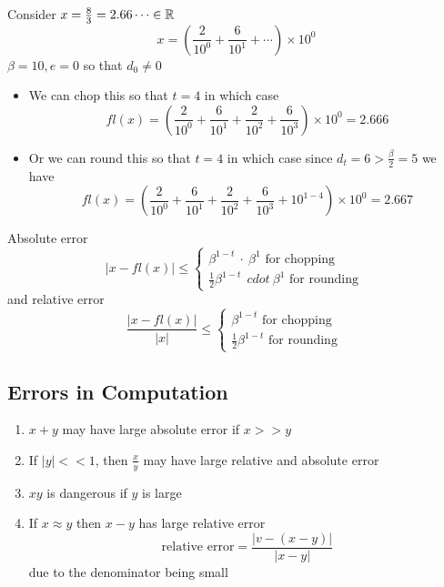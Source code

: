\documentclass[12pt]{scrartcl}
\begin{document}
\begin{example}
  Consider $x = \frac{8}{3} = 2.66\cdots \in \mathbb R$
  \[x = (\frac{2}{10^0} + \frac{6}{10^1} + \cdots) \times 10^0\]
  $\beta = 10, e = 0$ so that $d_0 \neq 0$

  \begin{itemize}
    \item We can chop this so that $t = 4$ in which case 
    \[fl(x) = (\frac{2}{10^0} + \frac{6}{10^1} + \frac{2}{10^2} + \frac{6}{10^3}) \times 10^0 = 2.666\]
    \item Or we can round this so that $t = 4$ in which case since $d_t = 6 > \frac{\beta}{2} = 5$ we have 
    \[fl(x) = (\frac{2}{10^0} + \frac{6}{10^1} + \frac{2}{10^2} + \frac{6}{10^3} + 10^{1-4}) \times 10^0 = 2.667\]
  \end{itemize}
\end{example}

\begin{theorem}
  Absolute error 
  \[|x - fl(x)| \leq \begin{cases}
    \beta^{1-t} \ \cdot \ \beta^1 \text{ for chopping } \\
    \frac{1}{2}\beta^{1-t} \ \ cdot \ \beta^1 \text{ for rounding }
  \end{cases}\]
  and relative error 
  \[\frac{|x - fl(x)|}{|x|} \leq \begin{cases}
    \beta^{1-t} \text{ for chopping } \\
    \frac{1}{2}\beta^{1-t} \text{ for rounding }
  \end{cases}\]
\end{theorem}

\subsection{Errors in Computation}


\begin{note}

\hfill

\begin{enumerate}
  \item $x + y$ may have large absolute error if $x >> y$
  \item If $|y| << 1$, then $\frac{x}{y}$ may have large relative and 
  absolute error 
  \item $xy$ is dangerous if $y$ is large
  \item If $x \approx y$ then $x - y$ has large relative error 
  \[\text{relative error} = \frac{|v - (x-y)|}{|x-y|}\]
  due to the denominator being small
\end{enumerate}
\end{note}
\end{document}
